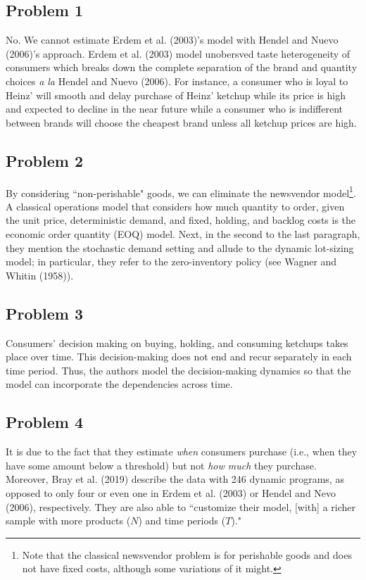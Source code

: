 \documentclass{article}
\begin{document}
\subsection*{Problem 1}
No. We cannot estimate Erdem et al. (2003)'s model with Hendel and Nuevo (2006)'s approach. Erdem et al. (2003) model unobersved taste heterogeneity of consumers which breaks down the complete separation of the brand and quantity choices \textit{a la} Hendel and Nuevo (2006). For instance, a consumer who is loyal to Heinz' will smooth and delay purchase of Heinz' ketchup while its price is high and expected to decline in the near future while a consumer who is indifferent between brands will choose the cheapest brand unless all ketchup prices are high.


\subsection*{Problem 2}
By considering ``non-perishable" goods, we can eliminate the newsvendor model\footnote{Note that the classical newsvendor problem is for perishable goods and does not have fixed costs, although some variations of it might.}. A classical operations model that considers how much quantity to order, given the unit price, deterministic demand, and fixed, holding, and backlog costs is the economic order quantity (EOQ) model. Next, in the second to the last paragraph, they mention the stochastic demand setting and allude to the dynamic lot-sizing model; in particular, they refer to the zero-inventory policy (see Wagner and Whitin (1958)).

\subsection*{Problem 3}
Consumers' decision making on buying, holding, and consuming ketchups takes place over time. This decision-making does not end and recur separately in each time period. Thus, the authors model the decision-making dynamics so that the model can incorporate the dependencies across time.

\subsection*{Problem 4}
It is due to the fact that they estimate \textit{when} consumers purchase (i.e., when they have some amount below a threshold) but not \textit{how much} they purchase. Moreover, Bray et al. (2019) describe the data with 246 dynamic programs, as opposed to only four or even one in Erdem et al. (2003) or Hendel and Nevo (2006), respectively. They are also able to ``customize their model, [with] a richer sample with more products ($N$) and time periods ($T$)." 
\end{document}
